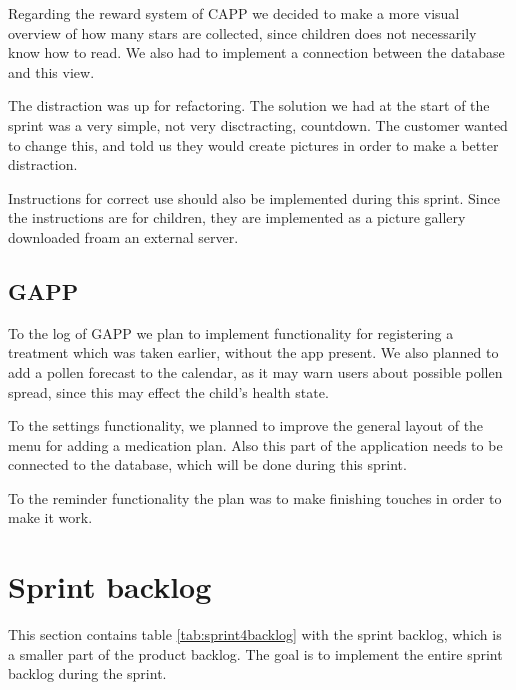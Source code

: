 Regarding the reward system of CAPP we decided to make a more visual overview of how many stars are 
collected, since children does not necessarily know how to read. We also had to implement a 
connection between the database and this view.

The distraction was up for refactoring. The solution we had at the start of the sprint was a 
very simple, not very disctracting, countdown. The customer wanted to change this, and 
told us they would create pictures in order to make a better distraction.

Instructions for correct use should also be implemented during this sprint. Since the 
instructions are for children, they are implemented as a picture gallery downloaded froam 
an external server. 

\subsection{GAPP}
To the log of GAPP we plan to implement functionality for registering a treatment which was 
taken earlier, without the app present. We also planned to add a pollen forecast to the 
calendar, as it may warn users about possible pollen spread, since this may effect the child's health state.

To the settings functionality, we planned to improve the general layout of the menu for 
adding a medication plan. Also this part of the application needs to be connected to 
the database, which will be done during this sprint.

To the reminder functionality the plan was to make finishing touches in order to make it work.

\section{Sprint backlog}
This section contains table \ref{tab:sprint4backlog} with the sprint backlog, which is a smaller part of the product 
backlog. The goal is to implement the entire sprint backlog during the sprint.

